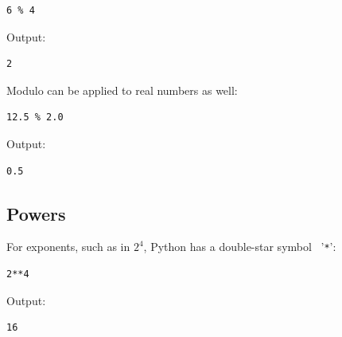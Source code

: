 \documentclass[article,A4,12pt]{llncs}
\begin{document}
\begin{bbox}
\begin{verbatim}
6 % 4
\end{verbatim}
\end{bbox}
\vspace{6mm}

\noindent
Output:\\

\begin{ybox}
\begin{verbatim}
2
\end{verbatim}
\end{ybox}
\vspace{6mm}

\noindent
Modulo can be applied to real numbers as well:\\

\begin{bbox}
\begin{verbatim}
12.5 % 2.0 
\end{verbatim}
\end{bbox}
\vspace{6mm}

\noindent
Output:\\

\begin{ybox}
\begin{verbatim}
0.5
\end{verbatim}
\end{ybox}
\vspace{6mm}

\noindent

\subsection{Powers}
For exponents, such as in $2^4$, Python has a double-star
symbol \ '{\tt **}':\\

\begin{bbox}
\begin{verbatim}
2**4
\end{verbatim}
\end{bbox}
\vspace{6mm}

\noindent
Output:\\

\begin{ybox}
\begin{verbatim}
16
\end{verbatim}
\end{ybox}
\vspace{6mm}
\end{document}
